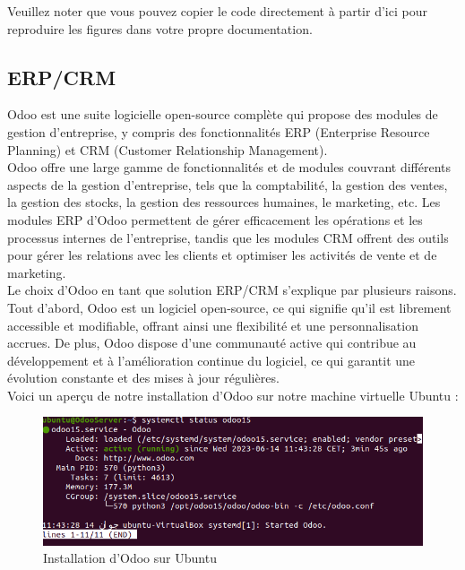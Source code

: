 Veuillez noter que vous pouvez copier le code directement à partir d'ici pour reproduire les figures dans votre propre documentation. \\



\subsection{ERP/CRM}

Odoo est une suite logicielle open-source complète qui propose des modules de gestion d'entreprise, y compris des fonctionnalités ERP (Enterprise Resource Planning) et CRM (Customer Relationship Management).  \\

Odoo offre une large gamme de fonctionnalités et de modules couvrant différents aspects de la gestion d'entreprise, tels que la comptabilité, la gestion des ventes, la gestion des stocks, la gestion des ressources humaines, le marketing, etc. Les modules ERP d'Odoo permettent de gérer efficacement les opérations et les processus internes de l'entreprise, tandis que les modules CRM offrent des outils pour gérer les relations avec les clients et optimiser les activités de vente et de marketing. \\

Le choix d'Odoo en tant que solution ERP/CRM s'explique par plusieurs raisons. Tout d'abord, Odoo est un logiciel open-source, ce qui signifie qu'il est librement accessible et modifiable, offrant ainsi une flexibilité et une personnalisation accrues. De plus, Odoo dispose d'une communauté active qui contribue au développement et à l'amélioration continue du logiciel, ce qui garantit une évolution constante et des mises à jour régulières. \\

Voici un aperçu de notre installation d'Odoo sur notre machine virtuelle Ubuntu : \\

\begin{figure}[H]
 \centering
    \includegraphics[width=15cm]{Images/OdooServer1.png}
    \caption{Installation d'Odoo sur Ubuntu}
    \label{fig:odoo-installation}
\end{figure}

